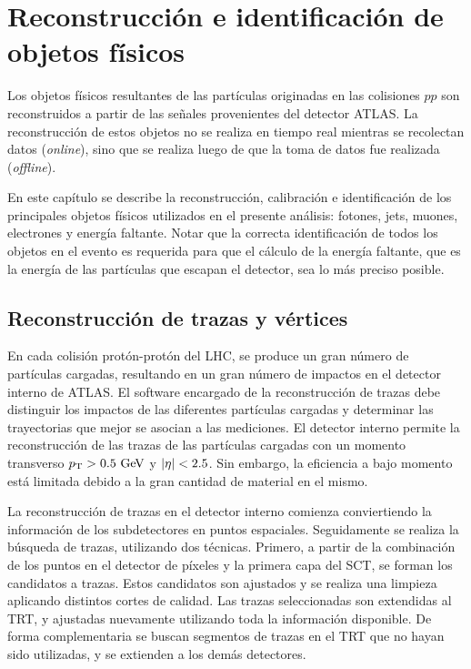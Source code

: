 \chapter{Reconstrucción e identificación de objetos físicos}
\label{cap:objetos}

Los objetos físicos resultantes de las partículas originadas en las colisiones
$pp$ son reconstruidos a partir de las señales provenientes del detector ATLAS.
La reconstrucción de estos objetos no se realiza en tiempo real mientras se
recolectan datos (\emph{online}), sino que se realiza luego de que la toma de
datos fue realizada (\emph{offline}).

En este capítulo se describe la reconstrucción, calibración e identificación de
los principales objetos físicos utilizados en el presente análisis: fotones,
jets, muones, electrones y energía faltante. Notar que la correcta
identificación de todos los objetos en el evento es requerida para que el
cálculo de la energía faltante, que es la energía de las partículas que escapan
el detector, sea lo más preciso posible.


\section{Reconstrucción de trazas y vértices}
\label{sec:obj_vertex}

En cada colisión protón-protón del LHC, se produce un gran número de partículas
cargadas, resultando en un gran número de impactos en el detector interno de
ATLAS. El software encargado de la reconstrucción de trazas debe distinguir los
impactos de las diferentes partículas cargadas y determinar las trayectorias que
mejor se asocian a las mediciones. El detector interno permite la reconstrucción
de las trazas de las partículas cargadas con un momento transverso $\pt>0.5 \gev$
y $\abseta < 2.5$. Sin embargo, la eficiencia a bajo momento está
limitada debido a la gran cantidad de material en el mismo.

La reconstrucción de trazas en el detector interno comienza conviertiendo la
información de los subdetectores en puntos espaciales. Seguidamente se realiza
la búsqueda de trazas, utilizando dos técnicas. Primero, a
partir de la combinación de los puntos en el detector de píxeles y la primera
capa del SCT, se forman los candidatos a trazas. Estos candidatos son ajustados
y se realiza una limpieza aplicando distintos cortes de calidad. Las
trazas seleccionadas son extendidas al TRT, y ajustadas nuevamente utilizando
toda la información disponible. De forma complementaria se buscan segmentos de
trazas en el TRT que no hayan sido utilizadas, y se extienden a los demás
detectores.

